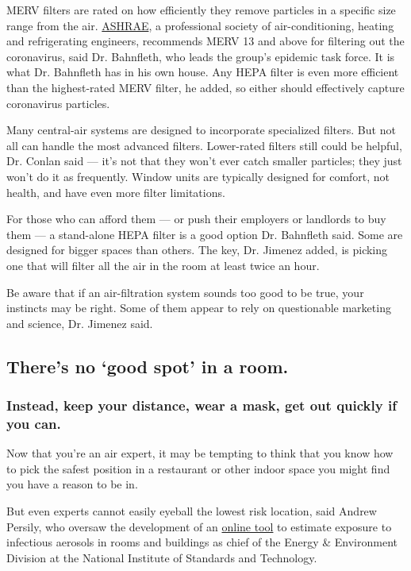 MERV filters are rated on how efficiently they remove particles in a
specific size range from the air.
\href{https://www.ashrae.org/about}{ASHRAE}, a professional society of
air-conditioning, heating and refrigerating engineers, recommends MERV
13 and above for filtering out the coronavirus, said Dr. Bahnfleth, who
leads the group's epidemic task force. It is what Dr. Bahnfleth has in
his own house. Any HEPA filter is even more efficient than the
highest-rated MERV filter, he added, so either should effectively
capture coronavirus particles.

Many central-air systems are designed to incorporate specialized
filters. But not all can handle the most advanced filters. Lower-rated
filters still could be helpful, Dr. Conlan said --- it's not that they
won't ever catch smaller particles; they just won't do it as frequently.
Window units are typically designed for comfort, not health, and have
even more filter limitations.

For those who can afford them --- or push their employers or landlords
to buy them --- a stand-alone HEPA filter is a good option Dr. Bahnfleth
said. Some are designed for bigger spaces than others. The key, Dr.
Jimenez added, is picking one that will filter all the air in the room
at least twice an hour.

Be aware that if an air-filtration system sounds too good to be true,
your instincts may be right. Some of them appear to rely on questionable
marketing and science, Dr. Jimenez said.

\hypertarget{theres-no-good-spot-in-a-room}{%
\subsection{There's no `good spot' in a
room.}\label{theres-no-good-spot-in-a-room}}

\hypertarget{instead-keep-your-distance-wear-a-mask-get-out-quickly-if-you-can}{%
\subsubsection{Instead, keep your distance, wear a mask, get out quickly
if you
can.}\label{instead-keep-your-distance-wear-a-mask-get-out-quickly-if-you-can}}

Now that you're an air expert, it may be tempting to think that you know
how to pick the safest position in a restaurant or other indoor space
you might find you have a reason to be in.

But even experts cannot easily eyeball the lowest risk location, said
Andrew Persily, who oversaw the development of an
\href{https://www.nist.gov/services-resources/software/fatima}{online
tool} to estimate exposure to infectious aerosols in rooms and buildings
as chief of the Energy \& Environment Division at the National Institute
of Standards and Technology.

